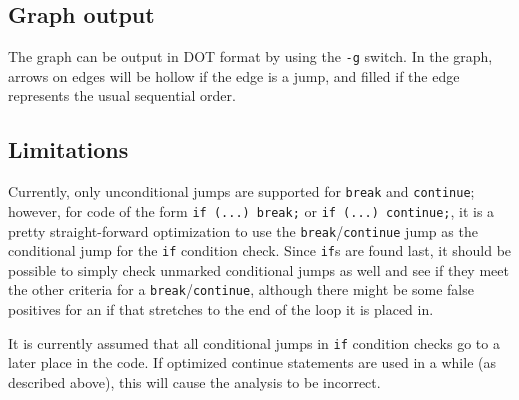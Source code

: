 \subsection{Graph output}
The graph can be output in DOT format by using the \verb+-g+ switch. In the graph, arrows on edges will be hollow if the edge is a jump, and filled if the edge represents the usual sequential order.

\subsection{Limitations}
Currently, only unconditional jumps are supported for \verb+break+ and \verb+continue+; however, for code of the form \verb+if (...) break;+ or \verb+if (...) continue;+, it is a pretty straight-forward optimization to use the \verb+break+/\verb+continue+ jump as the conditional jump for the \verb+if+ condition check. Since \verb+if+s are found last, it should be possible to simply check unmarked conditional jumps as well and see if they meet the other criteria for a \verb+break+/\verb+continue+, although there might be some false positives for an if that stretches to the end of the loop it is placed in.

It is currently assumed that all conditional jumps in \verb+if+ condition checks go to a later place in the code. If optimized continue statements are used in a while (as described above), this will cause the analysis to be incorrect.

